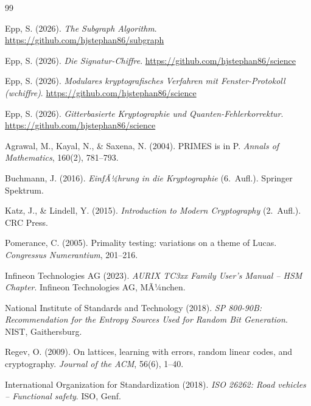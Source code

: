 ﻿\documentclass[a4paper,12pt]{article}
\theoremstyle{definition}
\begin{document}
\begin{thebibliography}{99}

 Epp, S. (2026). \emph{The Subgraph Algorithm}. \url{https://github.com/hjstephan86/subgraph}

 Epp, S. (2026). \emph{Die Signatur-Chiffre}. \url{https://github.com/hjstephan86/science}

 Epp, S. (2026). \emph{Modulares kryptografisches Verfahren mit Fenster-Protokoll (wchiffre)}. \url{https://github.com/hjstephan86/science}

 Epp, S. (2026). \emph{Gitterbasierte Kryptographie und Quanten-Fehlerkorrektur}. \url{https://github.com/hjstephan86/science}

 Agrawal, M., Kayal, N., \& Saxena, N. (2004). PRIMES is in P. \emph{Annals of Mathematics}, 160(2), 781--793.

 Buchmann, J. (2016). \emph{EinfÃ¼hrung in die Kryptographie} (6.\ Aufl.). Springer Spektrum.

 Katz, J., \& Lindell, Y. (2015). \emph{Introduction to Modern Cryptography} (2.\ Aufl.). CRC Press.

 Pomerance, C. (2005). Primality testing: variations on a theme of Lucas. \emph{Congressus Numerantium}, 201--216.

 Infineon Technologies AG (2023). \emph{AURIX TC3xx Family User's Manual -- HSM Chapter}. Infineon Technologies AG, MÃ¼nchen.

 National Institute of Standards and Technology (2018). \emph{SP 800-90B: Recommendation for the Entropy Sources Used for Random Bit Generation}. NIST, Gaithersburg.

 Regev, O. (2009). On lattices, learning with errors, random linear codes, and cryptography. \emph{Journal of the ACM}, 56(6), 1--40.

 International Organization for Standardization (2018). \emph{ISO 26262: Road vehicles -- Functional safety}. ISO, Genf.

\end{thebibliography}
\end{document}
